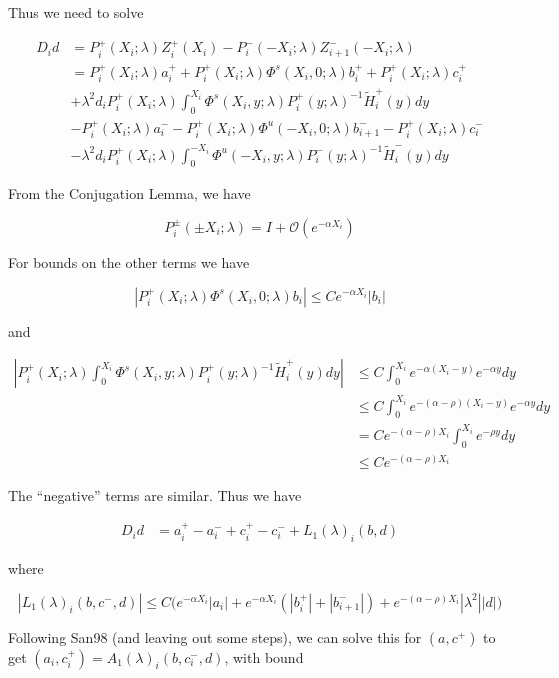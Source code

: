 \documentclass[12pt]{article}
\begin{document}
Thus we need to solve

\begin{align*}
D_i d &= P_i^+(X_i; \lambda) Z_i^+(X_i) - P_i^-(-X_i; \lambda) Z_{i+1}^-(-X_i; \lambda) \\
&= P_i^+(X_i; \lambda) a_i^+ + P_i^+(X_i; \lambda) \Phi^s(X_i, 0; \lambda) b_i^+ + P_i^+(X_i; \lambda) c_i^+ \\
&+ \lambda^2 d_i P_i^+(X_i; \lambda) \int_0^{X_i} \Phi^s(X_i, y; \lambda) P_i^+(y; \lambda)^{-1} \tilde{H}_i^+(y) dy \\
&- P_i^+(X_i; \lambda) a_i^- - P_i^+(X_i; \lambda) \Phi^u(-X_i, 0; \lambda) b_{i+1}^- - P_i^+(X_i; \lambda) c_i^- \\
&- \lambda^2 d_i P_i^+(X_i; \lambda) \int_0^{-X_i} \Phi^u(-X_i, y; \lambda) P_i^-(y; \lambda)^{-1} \tilde{H}_i^-(y) dy 
\end{align*}

From the Conjugation Lemma, we have

\[
P_i^\pm(\pm X_i; \lambda) = I + \mathcal{O}(e^{-\alpha X_i})
\]

For bounds on the other terms we have

\[
|P_i^+(X_i; \lambda) \Phi^s(X_i, 0; \lambda)b_i| \leq C e^{-\alpha X_i} |b_i|
\]

and

\begin{align*}
\left|
P_i^+(X_i; \lambda) \int_0^{X_i} \Phi^s(X_i, y; \lambda) P_i^+(y; \lambda)^{-1} \tilde{H}_i^+(y) dy \right| 
&\leq C \int_0^{X_i} e^{-\alpha(X_i - y)}e^{-\alpha y} dy \\
&\leq C \int_0^{X_i} e^{-(\alpha - \rho)(X_i - y)}e^{-\alpha y} dy \\
&= C e^{-(\alpha - \rho) X_i} \int_0^{X_i} e^{-\rho y} dy \\ 
&\leq C e^{-(\alpha - \rho) X_i} 
\end{align*}

The ``negative'' terms are similar. Thus we have

\begin{align*}
D_i d &= a_i^+ - a_i^- + c_i^+ - c_i^- + L_1(\lambda)_i(b, d)
\end{align*}

where

\[
|L_1(\lambda)_i(b, c^-, d)| \leq C \Big( e^{-\alpha X_i} |a_i| + e^{-\alpha X_i} (|b_i^+| + |b_{i+1}^-|) + e^{-(\alpha - \rho) X_i} |\lambda^2| |d| \Big)
\]

Following San98 (and leaving out some steps), we can solve this for $(a, c^+)$ to get $(a_i, c_i^+) = A_1(\lambda)_i(b, c_i^-, d)$, with bound
\end{document}
